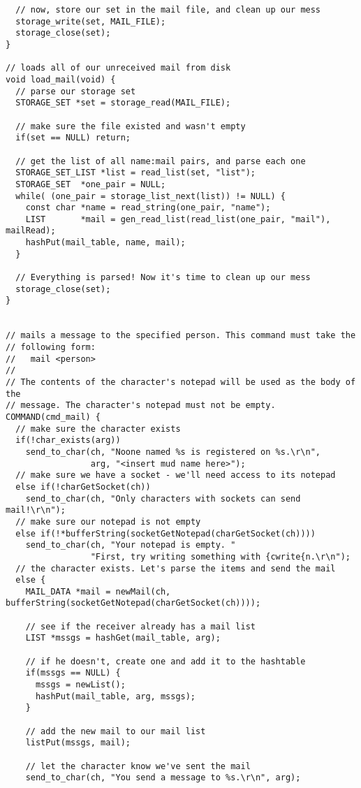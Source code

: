 \documentclass[12pt]{article}
\begin{document}
{\begin{verbatim}
  // now, store our set in the mail file, and clean up our mess
  storage_write(set, MAIL_FILE);
  storage_close(set);
}

// loads all of our unreceived mail from disk
void load_mail(void) {
  // parse our storage set
  STORAGE_SET *set = storage_read(MAIL_FILE);

  // make sure the file existed and wasn't empty
  if(set == NULL) return;

  // get the list of all name:mail pairs, and parse each one
  STORAGE_SET_LIST *list = read_list(set, "list");
  STORAGE_SET  *one_pair = NULL;
  while( (one_pair = storage_list_next(list)) != NULL) {
    const char *name = read_string(one_pair, "name");
    LIST       *mail = gen_read_list(read_list(one_pair, "mail"), mailRead);
    hashPut(mail_table, name, mail);
  }

  // Everything is parsed! Now it's time to clean up our mess
  storage_close(set);
}


// mails a message to the specified person. This command must take the 
// following form:
//   mail <person>
//
// The contents of the character's notepad will be used as the body of the
// message. The character's notepad must not be empty.
COMMAND(cmd_mail) {
  // make sure the character exists
  if(!char_exists(arg))
    send_to_char(ch, "Noone named %s is registered on %s.\r\n",
                 arg, "<insert mud name here>");
  // make sure we have a socket - we'll need access to its notepad
  else if(!charGetSocket(ch))
    send_to_char(ch, "Only characters with sockets can send mail!\r\n");
  // make sure our notepad is not empty
  else if(!*bufferString(socketGetNotepad(charGetSocket(ch))))
    send_to_char(ch, "Your notepad is empty. "
                 "First, try writing something with {cwrite{n.\r\n");
  // the character exists. Let's parse the items and send the mail
  else {
    MAIL_DATA *mail = newMail(ch, bufferString(socketGetNotepad(charGetSocket(ch))));
    
    // see if the receiver already has a mail list
    LIST *mssgs = hashGet(mail_table, arg);
    
    // if he doesn't, create one and add it to the hashtable
    if(mssgs == NULL) {
      mssgs = newList();
      hashPut(mail_table, arg, mssgs);
    }

    // add the new mail to our mail list
    listPut(mssgs, mail);

    // let the character know we've sent the mail
    send_to_char(ch, "You send a message to %s.\r\n", arg);


\end{verbatim}}
\end{document}
